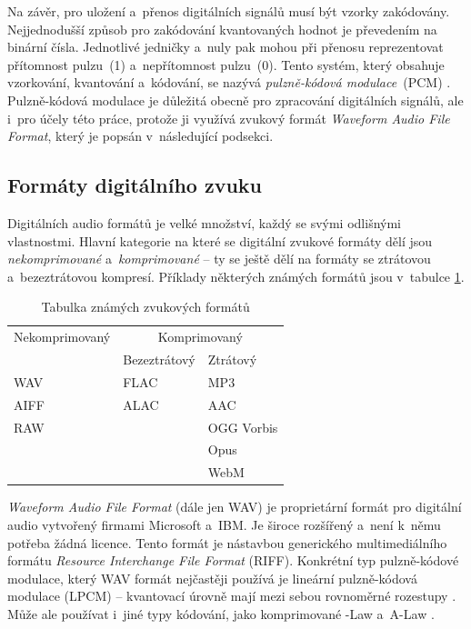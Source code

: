 Na závěr, pro uložení a~přenos digitálních signálů musí být vzorky zakódovány.
Nejjednodušší způsob pro zakódování kvantovaných hodnot je převedením na
binární čísla. Jednotlivé jedničky a~nuly pak mohou při přenosu reprezentovat
přítomnost pulzu~(1) a~nepřítomnost pulzu~(0). Tento systém, který obsahuje
vzorkování, kvantování a~kódování, se nazývá \textit{pulzně-kódová
modulace}~(PCM) \cite{Oliver1948}. Pulzně-kódová modulace je důležitá obecně
pro zpracování digitálních signálů, ale i~pro účely této práce, protože ji
využívá zvukový formát \textit{Waveform Audio File Format}, který je popsán
v~následující podsekci.

\subsection*{Formáty digitálního zvuku}
\label{sub:digital-audio-formats}

Digitálních audio formátů je velké množství, každý se svými odlišnými
vlastnostmi. Hlavní kategorie na které se digitální zvukové formáty dělí jsou
\textit{nekomprimované} a~\textit{komprimované} -- ty se ještě dělí na formáty
se ztrátovou a~bezeztrátovou kompresí. Příklady některých známých formátů jsou
v~tabulce \ref{tab:audio-formats}.

\begin{table}[H]
    \vskip6pt
    \caption{Tabulka známých zvukových formátů}
    \vskip6pt
    \centering
    \begin{tabular}{lll}
        \toprule
        Nekomprimovaný & \multicolumn{2}{c}{Komprimovaný} \\
        \cmidrule(r){2-3}
                       & Bezeztrátový & Ztrátový \\
        \midrule
        WAV  & FLAC & MP3 \\
        AIFF & ALAC & AAC \\
        RAW  &      & OGG Vorbis \\
             &      & Opus \\
             &      & WebM \\
        \bottomrule
    \end{tabular}
    \label{tab:audio-formats}
\end{table}

\textit{Waveform Audio File Format} (dále jen WAV) je proprietární formát pro
digitální audio vytvořený firmami Microsoft a~IBM. Je široce rozšířený a~není
k~němu potřeba žádná licence. Tento formát je nástavbou generického
multimediálního formátu \textit{Resource Interchange File Format} (RIFF).
Konkrétní typ pulzně-kódové modulace, který WAV formát nejčastěji používá je
lineární pulzně-kódová modulace (LPCM) \cite{WAVE} -- kvantovací úrovně mají
mezi sebou rovnoměrné rozestupy \cite{LPCM}. Může ale používat i~jiné typy
kódování, jako komprimované \textmu-Law a~A-Law \cite{WAVE}.

